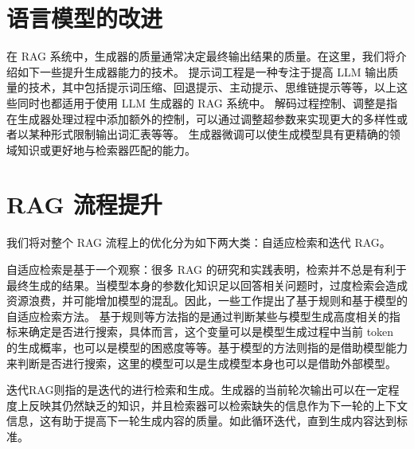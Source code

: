 \section{语言模型的改进}
在 RAG 系统中，生成器的质量通常决定最终输出结果的质量。在这里，我们将介绍如下一些提升生成器能力的技术。
提示词工程是一种专注于提高 LLM 输出质量的技术，其中包括提示词压缩、回退提示、主动提示、思维链提示等等，以上这些同时也都适用于使用 LLM 生成器的 RAG 系统中。
解码过程控制、调整是指在生成器处理过程中添加额外的控制，可以通过调整超参数来实现更大的多样性或者以某种形式限制输出词汇表等等。
生成器微调可以使生成模型具有更精确的领域知识或更好地与检索器匹配的能力。
\section{RAG 流程提升}
我们将对整个 RAG 流程上的优化分为如下两大类：自适应检索和迭代 RAG。

自适应检索是基于一个观察：很多 RAG 的研究和实践表明，检索并不总是有利于最终生成的结果。当模型本身的参数化知识足以回答相关问题时，过度检索会造成资源浪费，并可能增加模型的混乱。因此，一些工作提出了基于规则和基于模型的自适应检索方法。
基于规则等方法指的是通过判断某些与模型生成高度相关的指标来确定是否进行搜索，具体而言，这个变量可以是模型生成过程中当前 token 的生成概率，也可以是模型的困惑度等等。基于模型的方法则指的是借助模型能力来判断是否进行搜索，这里的模型可以是生成模型本身也可以是借助外部模型。

迭代RAG则指的是迭代的进行检索和生成。生成器的当前轮次输出可以在一定程度上反映其仍然缺乏的知识，并且检索器可以检索缺失的信息作为下一轮的上下文信息，这有助于提高下一轮生成内容的质量。如此循环迭代，直到生成内容达到标准。